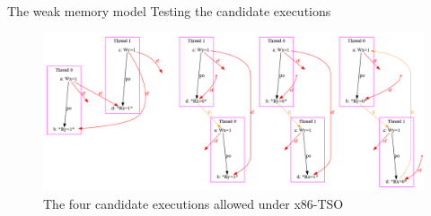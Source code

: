 \documentclass{beamer}
\begin{document}
\begin{frame}{The weak memory model} {Testing the candidate executions}
\vspace{10pt}
\begin{minipage}{.3\linewidth}
\hfill
\end{minipage}
%
\noindent\begin{minipage}{.4\linewidth}
\end{minipage}
%
\noindent\begin{minipage}{.25\linewidth}
\end{minipage}
\vspace{-5pt}
\begin{figure}
\centering
\includegraphics[width=\linewidth]{img/candidate.png}
\caption{The four candidate executions allowed under x86-TSO}
\end{figure}
\end{frame}
\end{document}
